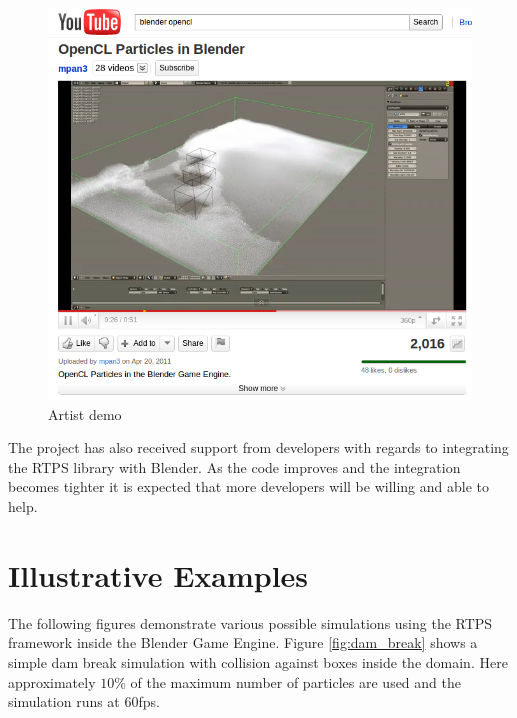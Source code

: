 \begin{figure}[!htc]
 		\centering
		\includegraphics[scale=0.75]{figures/youtube.png}
        \caption{ Artist demo }
		\label{fig:mpan}
\end{figure}

The project has also received support from developers with regards to
integrating the RTPS library with Blender. As the code improves and the
integration becomes tighter it is expected that more developers will be willing
and able to help.

\pagebreak

\section{Illustrative Examples}

The following figures demonstrate various possible simulations using the RTPS
framework inside the Blender Game Engine. Figure \ref{fig:dam_break} shows a
simple dam break simulation with collision against boxes inside the domain.
Here approximately $10\%$ of the maximum number of particles are used and the simulation runs at 60fps.

